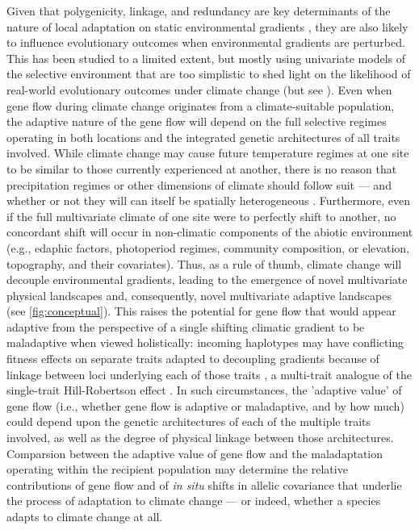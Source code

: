 \documentclass[9pt,twocolumn,twoside,lineno]{pnas-new}
\begin{document}
Given that polygenicity, linkage, and redundancy
are key determinants of the nature of local adaptation
on static environmental gradients \cite{barton,yeaman_whitlock,yeaman_review,lecorre},
they are also likely to influence evolutionary
outcomes when environmental gradients are perturbed.
This has been studied to a limited extent,
but mostly using univariate models of the selective environment
that are too simplistic to
shed light on the likelihood of
real-world evolutionary outcomes
under climate change (but see \cite{schiffers}).
Even when gene flow during climate change originates from a climate-suitable population,
the adaptive nature 
of the gene flow will depend on the full selective regimes operating in both locations
and the integrated genetic architectures of all traits involved. 
While climate change may cause 
future temperature regimes at one site to be similar to those currently 
experienced at another, there is no reason that precipitation regimes or other
dimensions of climate should follow suit --- and whether or not they will can
itself be spatially heterogeneous \cite{crimmins,daly}.
Furthermore, even if the full multivariate climate of one site were to 
perfectly shift to another, no concordant shift will occur in
non-climatic components of the abiotic environment (e.g., edaphic factors, photoperiod 
regimes, community composition, or elevation, topography, and their covariates). 
Thus, as a rule of thumb, climate change will 
decouple environmental gradients, 
leading to the emergence of novel multivariate physical landscapes
\cite{williams_novel_climates,williams_projected_novel_disappearing,fitzpatrick_climate_novelty_forecasts}
and, consequently, novel multivariate adaptive landscapes (see \ref{fig:conceptual}).
This raises the potential for gene flow that would appear adaptive
from the perspective of a single shifting climatic gradient
to be maladaptive when viewed holistically: 
incoming haplotypes may have conflicting fitness effects on separate traits
adapted to decoupling gradients
because of linkage between loci underlying each of those traits \cite{aitken_whitlock,schiffers},
a multi-trait analogue of the single-trait Hill-Robertson effect \cite{hill_robertson}. 
In such circumstances, the 'adaptive value' of gene flow (i.e., whether gene flow
is adaptive or maladaptive, and by how much) could depend 
upon the genetic architectures of each of the multiple traits involved,
as well as the degree of physical linkage between those architectures.
Comparsion between the adaptive value of gene flow
and the maladaptation operating within the recipient population
may determine the relative contributions of gene flow
and of \textit{in situ} shifts in allelic covariance
that underlie the process of adaptation to climate change --- or indeed,
whether a species adapts to climate change at all.
\end{document}
